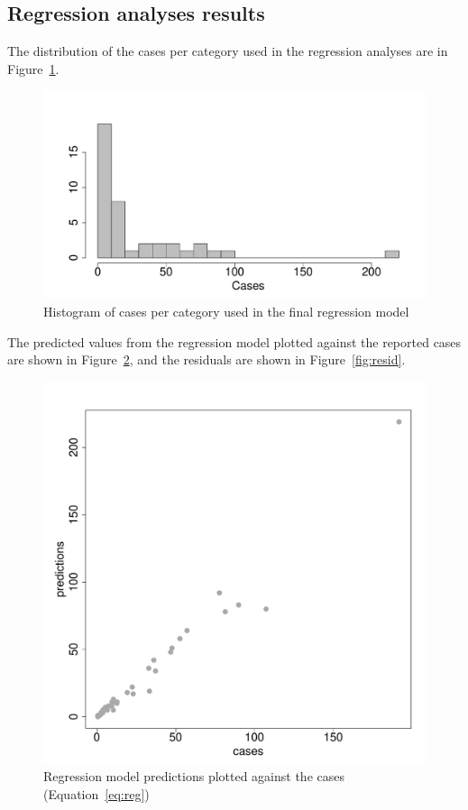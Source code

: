 \documentclass{article}
\begin{document}
\subsection{Regression analyses results}
\label{sub:regression_results}

The distribution of the cases per category used in the regression analyses are in Figure~\ref{fig:histcasecat}.
\begin{figure}[h!]
\begin{center}
\includegraphics{interimreport2-014}
\end{center}
\caption{Histogram of cases per category used in the final regression model}
\label{fig:histcasecat}
\end{figure}

The predicted values from the regression model plotted against the reported cases are shown in Figure~\ref{fig:predict}, and the residuals are shown in Figure~\ref{fig:resid}.
\begin{figure}[h!]
\begin{center}
\includegraphics{interimreport2-015}
\end{center}
\caption{Regression model predictions plotted against the cases (Equation~\ref{eq:reg})}
\label{fig:predict}
\end{figure}
\end{document}
